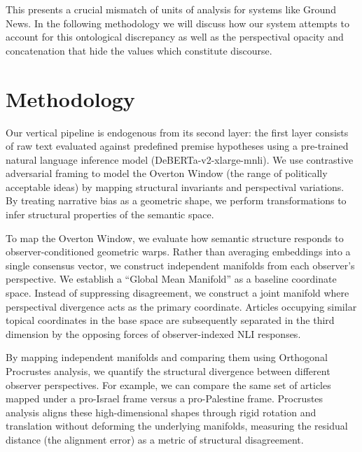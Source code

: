 This presents a crucial mismatch of units of analysis for systems like Ground News. In the following methodology we will discuss how our system attempts to account for this ontological discrepancy as well as the perspectival opacity and concatenation that hide the values which constitute discourse.



\section{Methodology}

Our vertical pipeline is endogenous from its second layer: the first layer consists of raw text evaluated against predefined premise hypotheses using a pre-trained natural language inference model (DeBERTa-v2-xlarge-mnli). We use contrastive adversarial framing to model the Overton Window (the range of politically acceptable ideas) by mapping structural invariants and perspectival variations. By treating narrative bias as a geometric shape, we perform transformations to infer structural properties of the semantic space.

To map the Overton Window, we evaluate how semantic structure responds to observer-conditioned geometric warps. Rather than averaging embeddings into a single consensus vector, we construct independent manifolds from each observer's perspective. We establish a ``Global Mean Manifold'' as a baseline coordinate space. Instead of suppressing disagreement, we construct a joint manifold where perspectival divergence acts as the primary coordinate. Articles occupying similar topical coordinates in the base space are subsequently separated in the third dimension by the opposing forces of observer-indexed NLI responses.

By mapping independent manifolds and comparing them using Orthogonal Procrustes analysis, we quantify the structural divergence between different observer perspectives. For example, we can compare the same set of articles mapped under a pro-Israel frame versus a pro-Palestine frame. Procrustes analysis aligns these high-dimensional shapes through rigid rotation and translation without deforming the underlying manifolds, measuring the residual distance (the alignment error) as a metric of structural disagreement.

